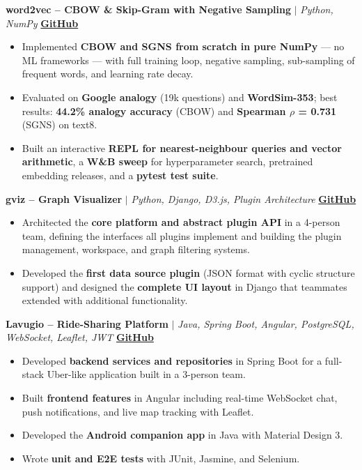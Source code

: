 \documentclass[11pt,letterpaper]{article}
\begin{document}
\textbf{word2vec -- CBOW \& Skip-Gram with Negative Sampling} $|$
\textit{Python, NumPy} \hfill \href{https://github.com/AStroCvijo/word2vec}{\textbf{GitHub}}
\begin{itemize}[noitemsep,topsep=2pt,leftmargin=*]
    \item Implemented \textbf{CBOW and SGNS from scratch in pure NumPy} — no ML frameworks — with full training loop, negative sampling, sub-sampling of frequent words, and learning rate decay.
    \item Evaluated on \textbf{Google analogy} (19k questions) and \textbf{WordSim-353}; best results: \textbf{44.2\% analogy accuracy} (CBOW) and \textbf{Spearman $\rho$ = 0.731} (SGNS) on text8.
    \item Built an interactive \textbf{REPL for nearest-neighbour queries and vector arithmetic}, a \textbf{W\&B sweep} for hyperparameter search, pretrained embedding releases, and a \textbf{pytest test suite}.
\end{itemize}

\vspace{0.1cm}

\textbf{gviz -- Graph Visualizer} $|$ \textit{Python, Django, D3.js, Plugin Architecture} \hfill \href{https://github.com/AStroCvijo/gviz}{\textbf{GitHub}}
\begin{itemize}[noitemsep,topsep=2pt,leftmargin=*]
    \item Architected the \textbf{core platform and abstract plugin API} in a 4-person team, defining the interfaces all plugins implement and building the plugin management, workspace, and graph filtering systems.
    \item Developed the \textbf{first data source plugin} (JSON format with cyclic structure support) and designed the \textbf{complete UI layout} in Django that teammates extended with additional functionality.
\end{itemize}

\textbf{Lavugio -- Ride-Sharing Platform} $|$
\textit{Java, Spring Boot, Angular, PostgreSQL, WebSocket, Leaflet, JWT} \hfill \href{https://github.com/kzi-nastava/mrs-team28-Lavugio}{\textbf{GitHub}}
\begin{itemize}[noitemsep,topsep=2pt,leftmargin=*]
    \item Developed \textbf{backend services and repositories} in Spring Boot for a full-stack Uber-like application built in a 3-person team.
    \item Built \textbf{frontend features} in Angular including real-time WebSocket chat, push notifications, and live map tracking with Leaflet.
    \item Developed the \textbf{Android companion app} in Java with Material Design 3.
    \item Wrote \textbf{unit and E2E tests} with JUnit, Jasmine, and Selenium.
\end{itemize}
\end{document}
